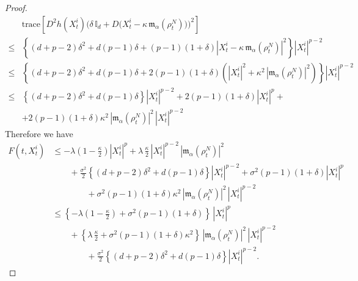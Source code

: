 \documentclass[10pt,a4paper]{amsart}
\begin{document}
\begin{proof}
\begin{align*}
    & 
    \text{trace}\left[D^{2}h(X^{i}_{t}) \bigg( \delta\,\mathds{I}_{d} + D\big(X^{i}_{t} - \kappa\,\mathfrak{m}_{\alpha}(\rho^{N}_{t})\big) \bigg)^{2} \right]\\
    \leq& \left\{ (d+p-2)\delta^{2} + d(p-1)\delta + (p-1)\left(1+\delta\right)|X^{i}_{t} - \kappa\,\mathfrak{m}_{\alpha}(\rho^{N}_{t})|^{2}\right\} |X^{i}_{t}|^{p-2}\\
    \leq& \left\{ (d+p-2)\delta^{2} + d(p-1)\delta + 2(p-1)\left(1+\delta\right)(|X^{i}_{t}|^{2} + \kappa^{2}\,|\mathfrak{m}_{\alpha}(\rho^{N}_{t})|^{2})\right\} |X^{i}_{t}|^{p-2}\\
    \leq&\left\{ (d+p-2)\delta^{2} + d(p-1)\delta\right\}|X^{i}_{t}|^{p-2} 
    + 2(p-1)\left(1+\delta\right) |X^{i}_{t}|^{p} +
     \\
    & +2(p-1)\left(1+\delta\right)\kappa^{2}\,|\mathfrak{m}_{\alpha}(\rho^{N}_{t})|^{2}\, |X^{i}_{t}|^{p-2}
\end{align*}
Therefore we have
\begin{align*}
    F(t,X^{i}_{t}) 
    & \leq -\lambda\left(1 -\frac{\kappa}{2}\right) |X^{i}_{t}|^{p} + \lambda\,\frac{\kappa}{2}\,|X^{i}_{t}|^{p-2}\,|\mathfrak{m}_{\alpha}(\rho^{N}_{t})|^{2} \\
    & \quad \quad +\frac{\sigma^{2}}{2}\left\{ (d+p-2)\delta^{2} + d(p-1)\delta\right\}|X^{i}_{t}|^{p-2} 
    + \sigma^{2}(p-1)\left(1+\delta\right) |X^{i}_{t}|^{p} 
     \\
    & \quad \quad \quad \quad +\sigma^{2}(p-1) \left( 1+\delta \right) \kappa^{2} \, |\mathfrak{m}_{\alpha} (\rho^{N}_{t})|^{2}\, |X^{i}_{t}|^{p-2}\\
    & \leq \left\{ -\lambda\left(1 -\frac{\kappa}{2}\right) + \sigma^{2}(p-1)\left(1+\delta\right) \right\}\,|X^{i}_{t}|^{p}  \\
    & \quad \quad + \left\{ \lambda\,\frac{\kappa}{2} + \sigma^{2}(p-1)\left(1+\delta\right)\kappa^{2} \right\}\,|\mathfrak{m}_{\alpha}(\rho^{N}_{t})|^{2}\, |X^{i}_{t}|^{p-2}\\
    & \quad \quad \quad \quad + \frac{\sigma^{2}}{2}\left\{ (d+p-2)\delta^{2} + d(p-1)\delta\right\}|X^{i}_{t}|^{p-2}.
\end{align*}


\end{proof}
\end{document}
